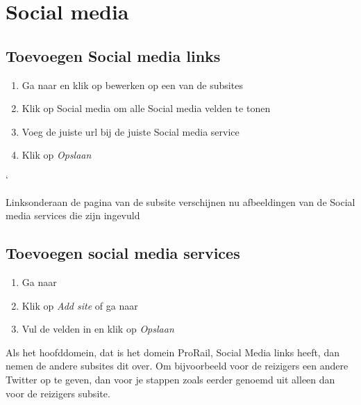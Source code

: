 \section{Social media}\label{socialmedia}

\subsection{Toevoegen Social media links}

\begin{enumerate}
\item Ga naar   en klik op bewerken op een van de subsites
\item Klik op Social media om alle Social media velden te tonen
\item Voeg de juiste url bij de juiste Social media service
\item Klik op \emph{Opslaan}
\end{enumerate}`

Linksonderaan de pagina van de subsite verschijnen nu afbeeldingen van de Social media services die zijn ingevuld

\subsection{Toevoegen social media services}

\begin{enumerate}
\item Ga naar   
\item Klik op \emph{Add site} of ga naar 
\item Vul de velden in en klik op \emph{Opslaan}
\end{enumerate}

Als het hoofddomein, dat is het domein ProRail, Social Media links heeft, dan nemen de andere subsites dit over. Om bijvoorbeeld voor de reizigers een andere Twitter op te geven, dan voor je stappen zoals eerder genoemd uit alleen dan voor de reizigers subsite.

